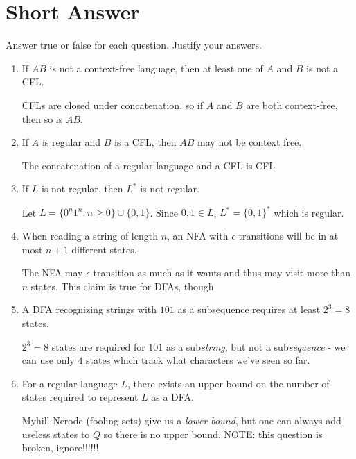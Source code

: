\documentclass[fleqn]{article}
\begin{document}
\section{Short Answer}
Answer true or false for each question. Justify your answers.
\begin{enumerate}
    \item If $AB$ is not a context-free language, then at least one of $A$ and $B$ is not a CFL.
    \begin{answer}
         CFLs are closed under concatenation, so if $A$ and $B$ are both context-free, then so is $AB$.
    \end{answer}
    \item If $A$ is regular and $B$ is a CFL, then $AB$ may not be context free.
    \begin{answer}
         The concatenation of a regular language and a CFL is CFL.
    \end{answer}
    \item If $L$ is not regular, then $L^*$ is not regular.
    \begin{answer}
         Let $L = \{0^n 1^n : n \geq 0\} \cup \{0,1\}$. Since $0, 1 \in L$, $L^* = \{0, 1\}^*$ which is regular.
    \end{answer}
    \item When reading a string of length $n$, an NFA with $\epsilon$-transitions will be in at most $n+1$ different states.
    \begin{answer}
         The NFA may $\epsilon$ transition as much as it wants and thus may visit more than $n$ states. This claim is true for DFAs, though.
    \end{answer}
    \item A DFA recognizing strings with $101$ as a subsequence requires at least $2^3 = 8$ states.
    \begin{answer}
         $2^3 = 8$ states are required for $101$ as a sub\textit{string}, but not a sub\textit{sequence} - we can use only $4$ states which track what characters we've seen so far.
    \end{answer}
    \item For a regular language $L$, there exists an upper bound on the number of states required to represent $L$ as a DFA.
    \begin{answer}
         Myhill-Nerode (fooling sets) give us a \textit{lower bound}, but one can always add useless states to $Q$ so there is no upper bound.
        NOTE: this question is broken, ignore!!!!!!
    \end{answer}
\end{enumerate}
\end{document}
